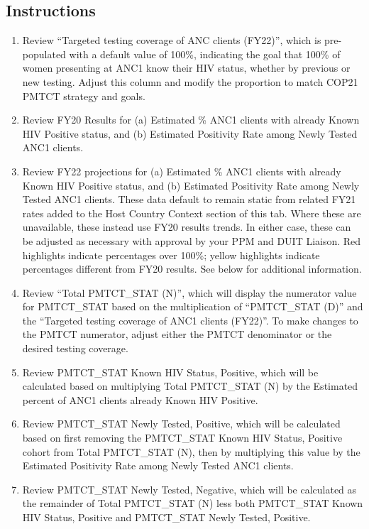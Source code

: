 \documentclass[
  openany]{book}
\begin{document}
\hypertarget{instructions-11}{%
\subsection{Instructions}\label{instructions-11}}

\begin{enumerate}
\def\labelenumi{\arabic{enumi}.}
\item
  Review ``Targeted testing coverage of ANC clients (FY22)'', which is
  pre-populated with a default value of 100\%, indicating the goal that
  100\% of women presenting at ANC1 know their HIV status, whether by
  previous or new testing. Adjust this column and modify the
  proportion to match COP21 PMTCT strategy and goals.
\item
  Review FY20 Results for (a) Estimated \% ANC1 clients with already
  Known HIV Positive status, and (b) Estimated Positivity Rate among
  Newly Tested ANC1 clients.
\item
  Review FY22 projections for (a) Estimated \% ANC1 clients with
  already Known HIV Positive status, and (b) Estimated Positivity Rate
  among Newly Tested ANC1 clients. These data default to remain static
  from related FY21 rates added to the Host Country Context section of
  this tab. Where these are unavailable, these instead use FY20
  results trends. In either case, these can be adjusted as necessary
  with approval by your PPM and DUIT Liaison. Red highlights indicate
  percentages over 100\%; yellow highlights indicate percentages
  different from FY20 results. See below for additional information.
\item
  Review ``Total PMTCT\_STAT (N)'', which will display the numerator
  value for PMTCT\_STAT based on the multiplication of ``PMTCT\_STAT (D)''
  and the ``Targeted testing coverage of ANC1 clients (FY22)''. To make
  changes to the PMTCT numerator, adjust either the PMTCT denominator
  or the desired testing coverage.
\item
  Review PMTCT\_STAT Known HIV Status, Positive, which will be
  calculated based on multiplying Total PMTCT\_STAT (N) by the
  Estimated percent of ANC1 clients already Known HIV Positive.
\item
  Review PMTCT\_STAT Newly Tested, Positive, which will be calculated
  based on first removing the PMTCT\_STAT Known HIV Status, Positive
  cohort from Total PMTCT\_STAT (N), then by multiplying this value by
  the Estimated Positivity Rate among Newly Tested ANC1 clients.
\item
  Review PMTCT\_STAT Newly Tested, Negative, which will be calculated
  as the remainder of Total PMTCT\_STAT (N) less both PMTCT\_STAT Known
  HIV Status, Positive and PMTCT\_STAT Newly Tested, Positive.
\end{enumerate}
\end{document}
